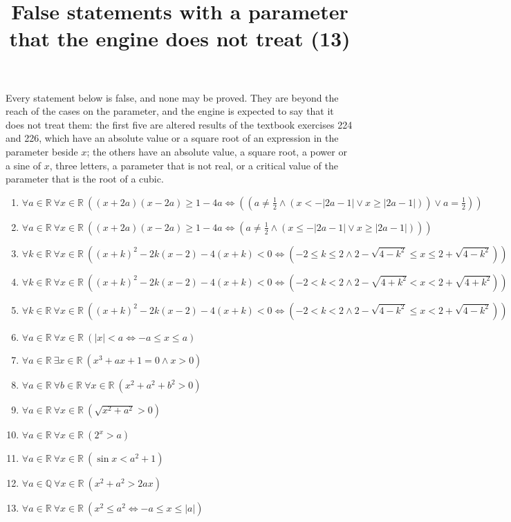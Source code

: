 \documentclass[11pt,a4paper]{article}
\title{False statements with a parameter that the engine does not treat (13)}
\author{}
\date{}
\begin{document}
\maketitle
Every statement below is false, and none may be proved. They are beyond the reach of the cases on the parameter, and the engine is expected to say that it does not treat them: the first five are altered results of the textbook exercises 224 and 226, which have an absolute value or a square root of an expression in the parameter beside $x$; the others have an absolute value, a square root, a power or a sine of $x$, three letters, a parameter that is not real, or a critical value of the parameter that is the root of a cubic.

\begin{enumerate}
\item $\displaystyle \forall a \in \mathbb{R}\ \forall x \in \mathbb{R}\ \left( (x + 2a)(x - 2a) \ge 1 - 4a \iff \left( (a \neq \frac{1}{2} \land (x < -\left|2a - 1\right| \lor x \ge \left|2a - 1\right|)) \lor a = \frac{1}{2} \right) \right)$
\item $\displaystyle \forall a \in \mathbb{R}\ \forall x \in \mathbb{R}\ \left( (x + 2a)(x - 2a) \ge 1 - 4a \iff \left( a \neq \frac{1}{2} \land (x \le -\left|2a - 1\right| \lor x \ge \left|2a - 1\right|) \right) \right)$
\item $\displaystyle \forall k \in \mathbb{R}\ \forall x \in \mathbb{R}\ \left( (x + k)^{2} - 2k(x - 2) - 4(x + k) < 0 \iff \left( -2 \le k \le 2 \land 2 - \sqrt{4 - k^{2}} \le x \le 2 + \sqrt{4 - k^{2}} \right) \right)$
\item $\displaystyle \forall k \in \mathbb{R}\ \forall x \in \mathbb{R}\ \left( (x + k)^{2} - 2k(x - 2) - 4(x + k) < 0 \iff \left( -2 < k < 2 \land 2 - \sqrt{4 + k^{2}} < x < 2 + \sqrt{4 + k^{2}} \right) \right)$
\item $\displaystyle \forall k \in \mathbb{R}\ \forall x \in \mathbb{R}\ \left( (x + k)^{2} - 2k(x - 2) - 4(x + k) < 0 \iff \left( -2 < k < 2 \land 2 - \sqrt{4 - k^{2}} \le x < 2 + \sqrt{4 - k^{2}} \right) \right)$
\item $\displaystyle \forall a \in \mathbb{R}\ \forall x \in \mathbb{R}\ \left(\left|x\right| < a \iff -a \le x \le a\right)$
\item $\displaystyle \forall a \in \mathbb{R}\ \exists x \in \mathbb{R}\ (x^{3} + ax + 1 = 0 \land x > 0)$
\item $\displaystyle \forall a \in \mathbb{R}\ \forall b \in \mathbb{R}\ \forall x \in \mathbb{R}\ (x^{2} + a^{2} + b^{2} > 0)$
\item $\displaystyle \forall a \in \mathbb{R}\ \forall x \in \mathbb{R}\ (\sqrt{x^{2} + a^{2}} > 0)$
\item $\displaystyle \forall a \in \mathbb{R}\ \forall x \in \mathbb{R}\ (2^{x} > a)$
\item $\displaystyle \forall a \in \mathbb{R}\ \forall x \in \mathbb{R}\ (\sin x < a^{2} + 1)$
\item $\displaystyle \forall a \in \mathbb{Q}\ \forall x \in \mathbb{R}\ (x^{2} + a^{2} > 2ax)$
\item $\displaystyle \forall a \in \mathbb{R}\ \forall x \in \mathbb{R}\ \left(x^{2} \le a^{2} \iff -a \le x \le \left|a\right|\right)$
\end{enumerate}
\end{document}
